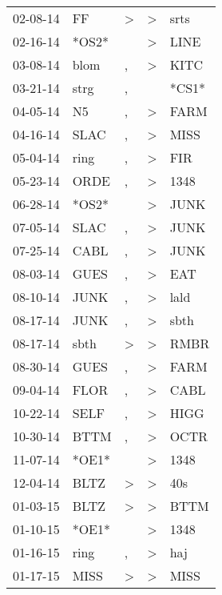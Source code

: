 \begin{supertabular}{lllll}
 02-08-14 &     FF &  \textgreater &     \textgreater &   srts \\
 02-16-14 &  *OS2* &               &     \textgreater &   LINE \\
 03-08-14 &   blom &             , &     \textgreater &   KITC \\
 03-21-14 &   strg &             , &                  &  *CS1* \\
 04-05-14 &     N5 &             , &     \textgreater &   FARM \\
 04-16-14 &   SLAC &             , &     \textgreater &   MISS \\
 05-04-14 &   ring &             , &     \textgreater &    FIR \\
 05-23-14 &   ORDE &             , &     \textgreater &   1348 \\
 06-28-14 &  *OS2* &               &     \textgreater &   JUNK \\
 07-05-14 &   SLAC &             , &     \textgreater &   JUNK \\
 07-25-14 &   CABL &             , &     \textgreater &   JUNK \\
 08-03-14 &   GUES &             , &     \textgreater &    EAT \\
 08-10-14 &   JUNK &             , &     \textgreater &   lald \\
 08-17-14 &   JUNK &             , &     \textgreater &   sbth \\
 08-17-14 &   sbth &  \textgreater &     \textgreater &   RMBR \\
 08-30-14 &   GUES &             , &     \textgreater &   FARM \\
 09-04-14 &   FLOR &             , &     \textgreater &   CABL \\
 10-22-14 &   SELF &             , &     \textgreater &   HIGG \\
 10-30-14 &   BTTM &             , &     \textgreater &   OCTR \\
 11-07-14 &  *OE1* &               &     \textgreater &   1348 \\
 12-04-14 &   BLTZ &  \textgreater &     \textgreater &    40s \\
 01-03-15 &   BLTZ &  \textgreater &     \textgreater &   BTTM \\
 01-10-15 &  *OE1* &               &     \textgreater &   1348 \\
 01-16-15 &   ring &             , &     \textgreater &    haj \\
 01-17-15 &   MISS &  \textgreater &     \textgreater &   MISS \\

\end{supertabular}
